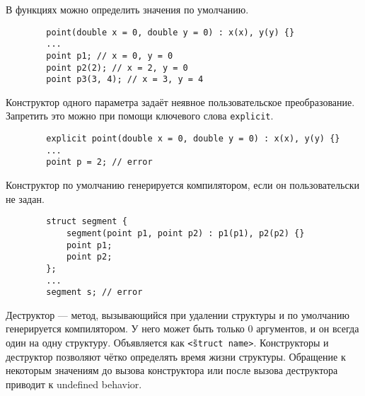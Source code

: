 \documentclass[15pt, a4paper]{article}
\newcommand{\nl}{\newline}
\begin{document}
    В функциях можно определить значения по умолчанию.
    \begin{verbatim}
    	point(double x = 0, double y = 0) : x(x), y(y) {}
        ...
        point p1; // x = 0, y = 0
        point p2(2); // x = 2, y = 0
        point p3(3, 4); // x = 3, y = 4
    \end{verbatim}
    Конструктор одного параметра задаёт неявное пользовательское преобразование. Запретить это можно при
    помощи ключевого слова \texttt{explicit}.
    \begin{verbatim}
    	explicit point(double x = 0, double y = 0) : x(x), y(y) {}
        ...
        point p = 2; // error
    \end{verbatim}
    Конструктор по умолчанию генерируется компилятором, если он пользовательски не задан.
    \begin{verbatim}
    	struct segment {
        	segment(point p1, point p2) : p1(p1), p2(p2) {}
            point p1;
            point p2;
        };
        ...
        segment s; // error
    \end{verbatim}
    Деструктор --- метод, вызывающийся при удалении структуры и по умолчанию генерируется компилятором.
    У него может быть только 0 аргументов, и он всегда один на одну структуру. Объявляется как \texttt{\~<struct
    name>}.\nl
    Конструкторы и деструктор позволяют чётко определять время жизни структуры. Обращение к некоторым
    значениям до вызова конструктора или после вызова деструктора приводит к undefined behavior.
    \newpage
\end{document}
